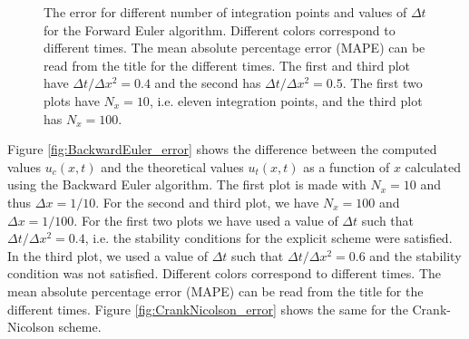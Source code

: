\documentclass[reprint, english,notitlepage,nofootinbib]{revtex4-1}  %
\begin{document}
\begin{figure}
  \caption{The error for different number of integration points and values of \(\Delta t\) for the Forward Euler algorithm. Different colors correspond to different times. The mean absolute percentage error (MAPE) can be read from the title for the different times. The first and third plot have \(\Delta t / \Delta x^2 = 0.4\) and the second has \(\Delta t / \Delta x^2 = 0.5\). The first two plots have \(N_x = 10\), i.e. eleven integration points, and the third plot has \(N_x = 100\).}
  \label{fig:ForwardEuler_error}
\end{figure}

Figure \ref{fig:BackwardEuler_error} shows the difference between the computed values \(u_c(x, t)\) and the theoretical values \(u_t(x, t)\) as a function of \(x\) calculated using the Backward Euler algorithm. The first plot is made with \(N_x = 10\) and thus \(\Delta x = 1/10\). For the second and third plot, we have \(N_x = 100\) and \(\Delta x = 1/100\). For the first two plots we have used a value of \(\Delta t\) such that \(\Delta t / \Delta x^2 = 0.4\), i.e. the stability conditions for the explicit scheme were satisfied. In the third plot, we used a value of \(\Delta t\) such that \(\Delta t / \Delta x^2 = 0.6\) and the stability condition was not satisfied. Different colors correspond to different times. The mean absolute percentage error (MAPE) can be read from the title for the different times.
Figure \ref{fig:CrankNicolson_error} shows the same for the Crank-Nicolson scheme.
\end{document}
